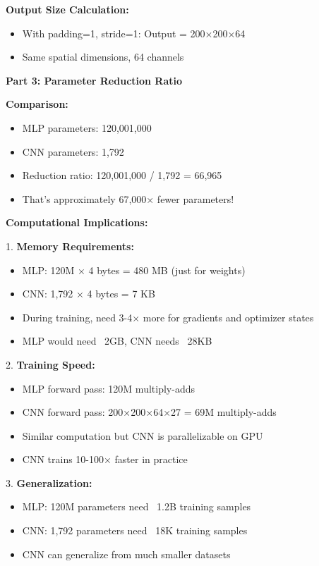 \documentclass[12pt]{article}
\newcommand{\explanation}[1]{{\color{explanationcolor}#1}}
\begin{document}
\begin{enumerate}[(a)]
{{    \textbf{Output Size Calculation:}
    \begin{itemize}
        \item With padding=1, stride=1: Output = 200×200×64
        \item Same spatial dimensions, 64 channels
    \end{itemize}
    }
    
    \textbf{Part 3: Parameter Reduction Ratio}
    
    \explanation{
    \textbf{Comparison:}
    \begin{itemize}
        \item MLP parameters: 120,001,000
        \item CNN parameters: 1,792
        \item Reduction ratio: 120,001,000 / 1,792 = 66,965
        \item That's approximately 67,000× fewer parameters!
    \end{itemize}
    
    \textbf{Computational Implications:}
    
    1. \textbf{Memory Requirements:}
    \begin{itemize}
        \item MLP: 120M × 4 bytes = 480 MB (just for weights)
        \item CNN: 1,792 × 4 bytes = 7 KB
        \item During training, need 3-4× more for gradients and optimizer states
        \item MLP would need ~2GB, CNN needs ~28KB
    \end{itemize}
    
    2. \textbf{Training Speed:}
    \begin{itemize}
        \item MLP forward pass: 120M multiply-adds
        \item CNN forward pass: 200×200×64×27 = 69M multiply-adds
        \item Similar computation but CNN is parallelizable on GPU
        \item CNN trains 10-100× faster in practice
    \end{itemize}
    
    3. \textbf{Generalization:}
    \begin{itemize}
        \item MLP: 120M parameters need ~1.2B training samples
        \item CNN: 1,792 parameters need ~18K training samples
        \item CNN can generalize from much smaller datasets
    \end{itemize}
    
}}
\end{enumerate}
\end{document}
